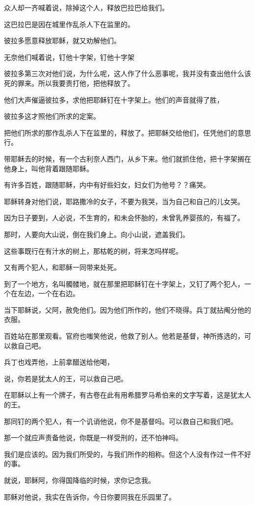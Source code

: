 \documentclass[12pt,oneside]{book}
\begin{document}
众人却一齐喊着说，除掉这个人，释放巴拉巴给我们。

这巴拉巴是因在城里作乱杀人下在监里的。

彼拉多愿意释放耶稣，就又劝解他们。

无奈他们喊着说，钉他十字架，钉他十字架

彼拉多第三次对他们说，为什么呢，这人作了什么恶事呢，我并没有查出他什么该死的罪来。所以我要责打他，把他释放了。

他们大声催逼彼拉多，求他把耶稣钉在十字架上。他们的声音就得了胜，

彼拉多这才照他们所求的定案。

把他们所求的那作乱杀人下在监里的，释放了。把耶稣交给他们，任凭他们的意思行。

带耶稣去的时候，有一个古利奈人西门，从乡下来。他们就抓住他，把十字架搁在他身上，叫他背着跟随耶稣。

有许多百姓，跟随耶稣，内中有好些妇女，妇女们为他号？？痛哭。

耶稣转身对他们说，耶路撒冷的女子，不要为我哭，当为自己和自己的儿女哭。

因为日子要到，人必说，不生育的，和未会怀胎的，未曾乳养婴孩的，有福了。

那时，人要向大山说，倒在我们身上。向小山说，遮盖我们。

这些事既行在有汁水的树上，那枯乾的树，将来怎吗样呢。

又有两个犯人，和耶稣一同带来处死。

到了一个地方，名叫髑髅地，就在那里把耶稣钉在十字架上，又钉了两个犯人，一个在左边，一个在右边。

当下耶稣说，父阿，赦免他们。因为他们所作的，他们不晓得。兵丁就拈阄分他的衣服。

百姓站在那里观看。官府也嗤笑他说，他救了别人。他若是基督，神所拣选的，可以救自己吧。

兵丁也戏弄他，上前拿醋送给他喝，

说，你若是犹太人的王，可以救自己吧。

在耶稣以上有一个牌子，有古卷在此有用希腊罗马希伯来的文字写着，这是犹太人的王。

那同钉的两个犯人，有一个讥诮他说，你不是基督吗。可以救自己和我们吧。

那一个就应声责备他说，你既是一样受刑的，还不怕神吗。

我们是应该的。因为我们所受的，与我们所作的相称。但这个人没有作过一件不好的事。

就说，耶稣阿，你得国降临的时候，求你记念我。

耶稣对他说，我实在告诉你，今日你要同我在乐园里了。
\end{document}
